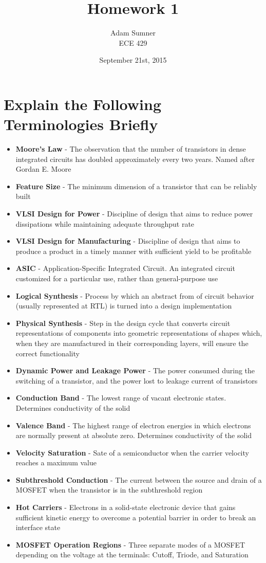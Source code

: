 \documentclass[11pt]{article}
\title{\textbf{Homework 1}}
\author{Adam Sumner \\ ECE 429}
\date{September 21st, 2015}
\begin{document}
\maketitle

\section{Explain the Following Terminologies Briefly}

\begin{itemize}
	\item \textbf{Moore's Law} - The observation that the number of transistors in dense integrated circuits has doubled approximately every two years. Named after Gordan E. Moore
	\item \textbf{Feature Size} - The minimum dimension of a transistor that can be reliably built
	\item \textbf{VLSI Design for Power} - Discipline of design that aims to reduce power dissipations while maintaining adequate throughput rate
	\item \textbf{VLSI Design for Manufacturing} - Discipline of design that aims to produce a product in a timely manner with sufficient yield to be profitable
	\item \textbf{ASIC} - Application-Specific Integrated Circuit. An integrated circuit customized for a particular use, rather than general-purpose use
	\item \textbf{Logical Synthesis} - Process by which an abstract from of circuit behavior (usually represented at RTL) is turned into a design implementation
	\item \textbf{Physical Synthesis} - Step in the design cycle that converts circuit representations of components into geometric representations of shapes which, when they are manufactured in their corresponding layers, will ensure the correct functionality
	\item \textbf{Dynamic Power and Leakage Power} - The power consumed during the switching of a transistor, and the power lost to leakage current of transistors
	\item \textbf{Conduction Band} - The lowest range of vacant electronic states. Determines conductivity of the solid
	\item \textbf{Valence Band} - The highest range of electron energies in which electrons are normally present at absolute zero. Determines conductivity of the solid
	\item \textbf{Velocity Saturation} - Sate of a semiconductor when the carrier velocity reaches a maximum value
	\item \textbf{Subthreshold Conduction} - The current between the source and drain of a MOSFET when the transistor is in the subthreshold region
	\item \textbf{Hot Carriers} - Electrons in a solid-state electronic device that gains sufficient kinetic energy to overcome a potential barrier in order to break an interface state
	\item \textbf{MOSFET Operation Regions} - Three separate modes of a MOSFET depending on the voltage at the terminals: Cutoff, Triode, and Saturation
\end{itemize}
\end{document}
